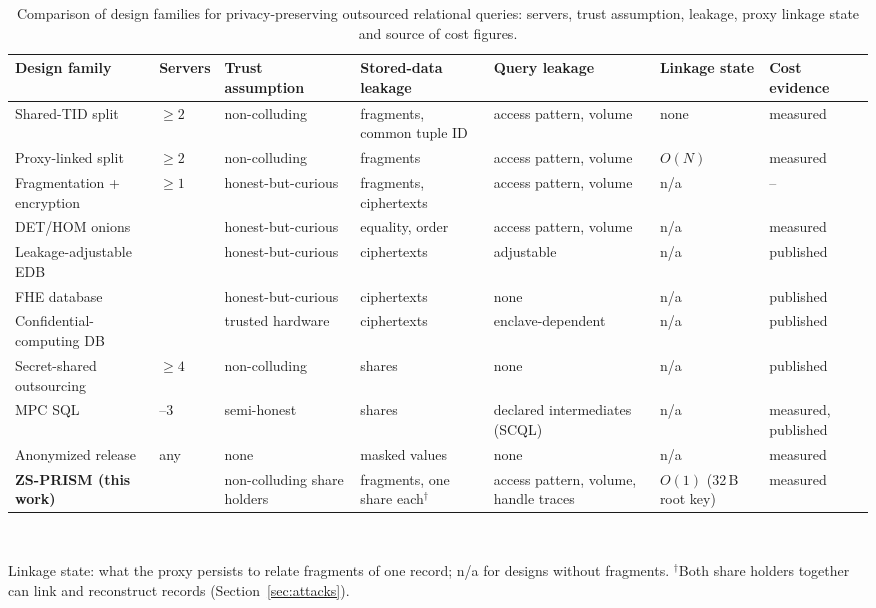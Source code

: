 \documentclass[conference]{IEEEtran}
\newcommand{\sys}{ZS-PRISM}
\begin{document}
\begin{table}[t]
\centering
\caption{Comparison of design families for privacy-preserving outsourced relational queries: servers, trust assumption, leakage, proxy linkage state and source of cost figures.}
\label{tab:related}
\scriptsize
\setlength{\tabcolsep}{3pt}
\begin{tabular}{@{}>{\raggedright\arraybackslash}p{34mm}>{\raggedright\arraybackslash}p{11mm}>{\raggedright\arraybackslash}p{24mm}>{\raggedright\arraybackslash}p{29mm}>{\raggedright\arraybackslash}p{27mm}>{\raggedright\arraybackslash}p{19mm}>{\raggedright\arraybackslash}p{18mm}@{}}
\toprule
Design family & Servers & Trust assumption & Stored-data leakage & Query leakage & Linkage state & Cost evidence\\
\midrule
Shared-TID split \cite{aggarwal2005two,ganapathy2012distributing} & $\ge 2$ & non-colluding & fragments, common tuple ID & access pattern, volume & none & measured \\
Proxy-linked split \cite{domingo2019survey} & $\ge 2$ & non-colluding & fragments & access pattern, volume & $O(N)$ & measured \\
Fragmentation + encryption \cite{ciriani2010combining,ciriani2009keep} & $\ge 1$ & honest-but-curious & fragments, ciphertexts & access pattern, volume & n/a & -- \\
DET/HOM onions \cite{popa2011cryptdb,papadimitriou2016seabed} & 1 & honest-but-curious & equality, order & access pattern, volume & n/a & measured \\
Leakage-adjustable EDB \cite{demertzis2020seal,liu2024ddse} & 1 & honest-but-curious & ciphertexts & adjustable & n/a & published \\
FHE database \cite{bian2023he3db} & 1 & honest-but-curious & ciphertexts & none & n/a & published \\
Confidential-computing DB \cite{li2023hedb} & 1 & trusted hardware & ciphertexts & enclave-dependent & n/a & published \\
Secret-shared outsourcing \cite{sharma2023s2,gupta2019obscure} & $\ge 4$ & non-colluding & shares & none & n/a & published \\
MPC SQL \cite{fang2024scql,liagouris2023secrecy,sohn2025alchemy,bogdanov2008sharemind,poddar2021senate} & 2--3 & semi-honest & shares & declared intermediates (SCQL) & n/a & measured, published \\
Anonymized release \cite{lefevre2006mondrian,domingo2005ordinal} & any & none & masked values & none & n/a & measured \\
\textbf{\sys{} (this work)} & 3 & non-colluding share holders & fragments, one share each$^{\dagger}$ & access pattern, volume, handle traces & $O(1)$ (32\,B root key) & measured \\
\bottomrule
\end{tabular}\\[2pt]
\raggedright\scriptsize Linkage state: what the proxy persists to relate fragments of one record; n/a for designs without fragments. $^{\dagger}$Both share holders together can link and reconstruct records (Section~\ref{sec:attacks}).
\end{table}
\end{document}
